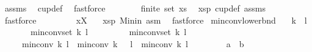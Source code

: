 \begin{isabellebody}
\ assms\ \isamarkupfalse%
\ cup{\isacharunderscore}{\kern0pt}def\ \isamarkupfalse%
\ fastforce\isanewline
\ \ \isamarkupfalse%
\ \ \ \ \ {\isachardoublequoteopen}finite\ {\isacharparenleft}{\kern0pt}set\ xs{\isacharparenright}{\kern0pt}{\isachardoublequoteclose}\ \isamarkupfalse%
\ xsp{\isacharparenleft}{\kern0pt}{}{\isacharparenright}{\kern0pt}\ cup{\isacharunderscore}{\kern0pt}def\ assms{\isacharparenleft}{\kern0pt}{}{\isacharparenright}{\kern0pt}\ \isamarkupfalse%
\ fastforce\isanewline
\ \ \isamarkupfalse%
\ \ \ \ \ \ {\isachardoublequoteopen}x{\isasymin}X{\isachardoublequoteclose}\ \isamarkupfalse%
\ {}\ xsp\ Min{\isacharunderscore}{\kern0pt}in\ asm\ \isamarkupfalse%
\ fastforce\isanewline
{}\isamarkupfalse%
%
\endisatagproof
{\isafoldproof}%
%
\isadelimproof
\isanewline
%
\endisadelimproof
\isanewline
{}\isamarkupfalse%
\ min{\isacharunderscore}{\kern0pt}conv{\isacharunderscore}{\kern0pt}lower{\isacharunderscore}{\kern0pt}bnd{\isacharcolon}{\kern0pt}\isanewline
\ \ \ {\isachardoublequoteopen}k{\isasymge}{}{\isachardoublequoteclose}\ \ {\isachardoublequoteopen}l{\isasymge}{}{\isachardoublequoteclose}\isanewline
\ \ \ \ \ \ \ {\isachardoublequoteopen}min{\isacharunderscore}{\kern0pt}conv{\isacharunderscore}{\kern0pt}set\ {\isacharparenleft}{\kern0pt}k{\isacharminus}{\kern0pt}{}{\isacharparenright}{\kern0pt}\ l\ {\isasymnoteq}\ {\isacharbraceleft}{\kern0pt}{\isacharbraceright}{\kern0pt}{\isachardoublequoteclose}\isanewline
\ \ \ \ \ \ \ {\isachardoublequoteopen}min{\isacharunderscore}{\kern0pt}conv{\isacharunderscore}{\kern0pt}set\ k\ {\isacharparenleft}{\kern0pt}l{\isacharminus}{\kern0pt}{}{\isacharparenright}{\kern0pt}\ {\isasymnoteq}\ {\isacharbraceleft}{\kern0pt}{\isacharbraceright}{\kern0pt}{\isachardoublequoteclose}\isanewline
\ \ \ \ \ {\isachardoublequoteopen}min{\isacharunderscore}{\kern0pt}conv\ k\ l\ {\isasymle}\ min{\isacharunderscore}{\kern0pt}conv\ {\isacharparenleft}{\kern0pt}k\ {\isacharminus}{\kern0pt}\ {}{\isacharparenright}{\kern0pt}\ l\ {\isacharplus}{\kern0pt}\ min{\isacharunderscore}{\kern0pt}conv\ k\ {\isacharparenleft}{\kern0pt}l\ {\isacharminus}{\kern0pt}\ {}{\isacharparenright}{\kern0pt}\ {\isacharminus}{\kern0pt}\ {}{\isachardoublequoteclose}\ \ \ \ {\isacharparenleft}{\kern0pt}\ {\isachardoublequoteopen}{\isacharquery}{\kern0pt}a\ {\isasymle}\ {\isacharquery}{\kern0pt}b{\isachardoublequoteclose}{\isacharparenright}{\kern0pt}\ \isanewline

\end{isabellebody}
